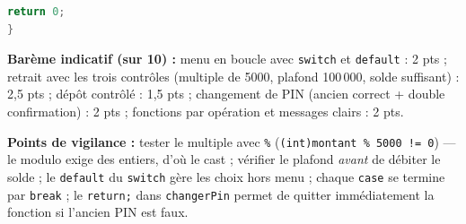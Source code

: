 \documentclass[11pt]{article}
\begin{document}
\begin{corrige}
\begin{lstlisting}[language=C]
    return 0;
}
\end{lstlisting}

\textbf{Barème indicatif (sur 10) :} menu en boucle avec \texttt{switch} et \texttt{default} : 2 pts ; retrait avec les trois contrôles (multiple de 5000, plafond 100\,000, solde suffisant) : 2,5 pts ; dépôt contrôlé : 1,5 pts ; changement de PIN (ancien correct + double confirmation) : 2 pts ; fonctions par opération et messages clairs : 2 pts.

\textbf{Points de vigilance :} tester le multiple avec \texttt{\%} (\texttt{(int)montant \% 5000 != 0}) — le modulo exige des entiers, d'où le cast ; vérifier le plafond \emph{avant} de débiter le solde ; le \texttt{default} du \texttt{switch} gère les choix hors menu ; chaque \texttt{case} se termine par \texttt{break} ; le \texttt{return;} dans \texttt{changerPin} permet de quitter immédiatement la fonction si l'ancien PIN est faux.
\end{corrige}
\end{document}
